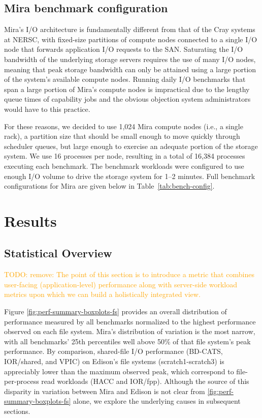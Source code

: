 \documentclass[conference,10pt,compsocconf]{IEEEtran}
\newcommand{\todo}[1]{\textcolor{Orange}{TODO: #1}}
\begin{document}
\subsection{Mira benchmark configuration} \label{sec:platforms/mirabenchmarks}

Mira's I/O architecture is fundamentally different from that of the Cray
systems at NERSC, with fixed-size partitions of compute nodes connected to
a single I/O node that forwards application I/O requests to the SAN.
Saturating the I/O bandwidth of the underlying storage servers requires the
use of many I/O nodes, meaning that peak storage bandwidth can only be
attained using a large portion of the system's available compute nodes.
Running daily I/O benchmarks that span a large portion of Mira's compute
nodes is impractical due to the lengthy queue times of capability jobs and
the obvious objection system administrators would have to this practice.

For these reasons, we decided to use 1,024 Mira compute nodes (i.e., a single
rack), a partition size that should be small enough to move quickly through
scheduler queues, but large enough to exercise an adequate portion of the
storage system. We use 16 processes per node, resulting in a total of 16,384
processes executing each benchmark. The benchmark workloads were configured
to use enough I/O volume to drive the storage system for 1--2 minutes.
Full benchmark configurations for Mira are given below in
Table~\ref{tab:bench-config}.

\section{Results} \label{sec:results}

\subsection{Statistical Overview} \label{sec:results/overview}

\todo{remove: The point of this section is to introduce a metric that combines user-facing (application-level) performance along with server-side workload metrics upon which we can build a holistically integrated view.}

Figure \ref{fig:perf-summary-boxplots-fs} provides an overall distribution of
performance measured by all benchmarks normalized to the highest performance observed on each file system.  Mira's distribution of variation is the most narrow, with all benchmarks' 25th percentiles well above 50\% of that file system's peak performance.  By comparison, shared-file I/O performance (BD-CATS, IOR/shared, and VPIC) on Edison's file systems (scratch1-scratch3) is appreciably lower than the maximum observed peak, which correspond to file-per-process read workloads (HACC and IOR/fpp).  Although the source of this disparity in variation between Mira and Edison is not clear from \ref{fig:perf-summary-boxplots-fs} alone, we explore the underlying causes in subsequent sections.
\end{document}
